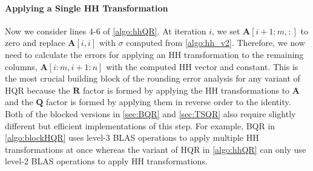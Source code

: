 \documentclass[review,onefignum,onetabnum]{siamart190516}
\newcommand{\bb}[1]{\mathbf{#1}}
\begin{document}
\paragraph{Applying a Single HH Transformation}
Now we consider lines 4-6 of \cref{algo:hhQR}.
At iteration $i$, we set $\bb{A}[i+1:m,:]$ to zero and replace $\bb{A}[i,i]$ with $\sigma$ computed from \cref{algo:hh_v2}.
Therefore, we now need to calculate the errors for applying an HH transformation to the remaining columns, $\bb{A}[i:m, i+1:n]$ with the computed HH vector and constant.
This is the most crucial building block of the rounding error analysis for any variant of HQR because the $\bb{R}$ factor is formed by applying the HH transformations to $\bb{A}$ and the $\bb{Q}$ factor is formed by applying them in reverse order to the identity.
Both of the blocked versions in \cref{sec:BQR} and \cref{sec:TSQR} also require slightly different but efficient implementations of this step.
For example, BQR in \cref{algo:blockHQR} uses level-3 BLAS operations to apply multiple HH transformations at once whereas the variant of HQR in \cref{algo:hhQR} can only use level-2 BLAS operations to apply HH transformations.\par
\end{document}
